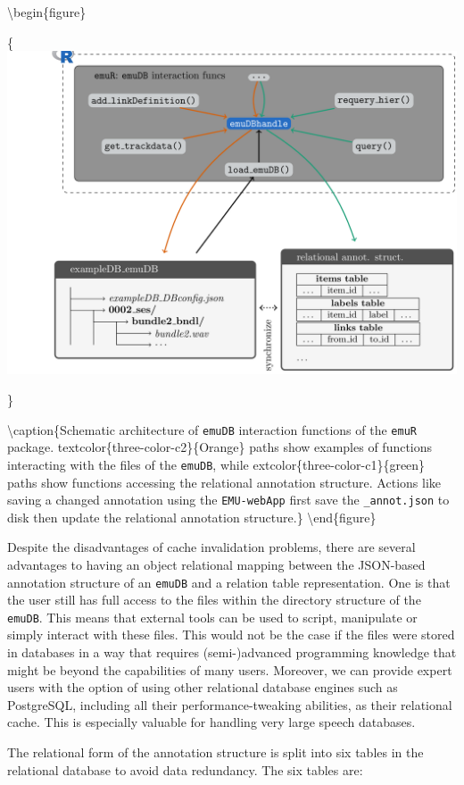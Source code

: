 \documentclass[]{book}
\begin{document}
\textbackslash{}begin\{figure\}

\{\centering \includegraphics[width=0.75\linewidth]{pics/emuRstruct}

\}

\textbackslash{}caption\{Schematic architecture of \texttt{emuDB} interaction functions of the \texttt{emuR} package. textcolor\{three-color-c2\}\{Orange\} paths show examples of functions interacting with the files of the \texttt{emuDB}, while extcolor\{three-color-c1\}\{green\} paths show functions accessing the relational annotation structure. Actions like saving a changed annotation using the \texttt{EMU-webApp} first save the \texttt{\_annot.json} to disk then update the relational annotation structure.\}\label{fig:query-schematic-emuR-structure}
\textbackslash{}end\{figure\}

Despite the disadvantages of cache invalidation problems, there are several advantages to having an object relational mapping between the JSON-based annotation structure of an \texttt{emuDB} and a relation table representation. One is that the user still has full access to the files within the directory structure of the \texttt{emuDB}. This means that external tools can be used to script, manipulate or simply interact with these files. This would not be the case if the files were stored in databases in a way that requires (semi-)advanced programming knowledge that might be beyond the capabilities of many users. Moreover, we can provide expert users with the option of using other relational database engines such as PostgreSQL, including all their performance-tweaking abilities, as their relational cache. This is especially valuable for handling very large speech databases.

The relational form of the annotation structure is split into six tables in the relational database to avoid data redundancy. The six tables are:
\end{document}
